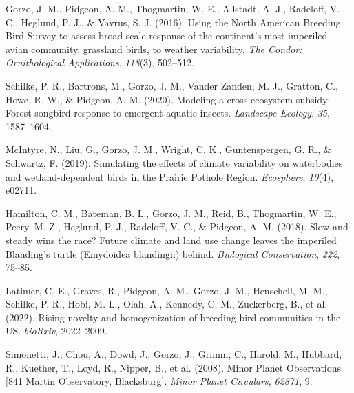 \documentclass[11pt,a4paper,]{awesome-cv}
\newlength{\cslhangindent}
\newenvironment{CSLReferences}[2] %
 {\begin{list}{}{%
  \setlength{\itemindent}{0pt}
  \setlength{\leftmargin}{0pt}
  \setlength{\parsep}{0pt}
  \ifodd #1
   \setlength{\leftmargin}{\cslhangindent}
   \setlength{\itemindent}{-1\cslhangindent}
  \fi
  \setlength{\itemsep}{#2\baselineskip}}}
 {\end{list}}
\renewcommand{\section}[1]{%
	\vspace{\acvSectionTopSkip}
	\sectionstyle{#1}
	\phantomsection
	\color{gray}\vhrulefill{0.9pt}
}
\begin{document}
\section{Peer-Reviewed Publications}\label{peer-reviewed-publications}

\label{refs-ac9b1bd4beeebee61ed7fb33c33f685f}
\begin{CSLReferences}{1}{0}
Gorzo, J. M., Pidgeon, A. M., Thogmartin, W. E., Allstadt, A. J.,
Radeloff, V. C., Heglund, P. J., \& Vavrus, S. J. (2016). Using the
North American Breeding Bird Survey to assess broad-scale response of
the continent's most imperiled avian community, grassland birds, to
weather variability. \emph{The Condor: Ornithological Applications},
\emph{118}(3), 502--512.

Schilke, P. R., Bartrons, M., Gorzo, J. M., Vander Zanden, M. J.,
Gratton, C., Howe, R. W., \& Pidgeon, A. M. (2020). Modeling a
cross-ecosystem subsidy: Forest songbird response to emergent aquatic
insects. \emph{Landscape Ecology}, \emph{35}, 1587--1604.

McIntyre, N., Liu, G., Gorzo, J. M., Wright, C. K., Guntenspergen, G.
R., \& Schwartz, F. (2019). Simulating the effects of climate
variability on waterbodies and wetland-dependent birds in the Prairie
Pothole Region. \emph{Ecosphere}, \emph{10}(4), e02711.

Hamilton, C. M., Bateman, B. L., Gorzo, J. M., Reid, B., Thogmartin, W.
E., Peery, M. Z., Heglund, P. J., Radeloff, V. C., \& Pidgeon, A. M.
(2018). Slow and steady wins the race? Future climate and land use
change leaves the imperiled Blanding's turtle (Emydoidea blandingii)
behind. \emph{Biological Conservation}, \emph{222}, 75--85.

Latimer, C. E., Graves, R., Pidgeon, A. M., Gorzo, J. M., Henschell, M.
M., Schilke, P. R., Hobi, M. L., Olah, A., Kennedy, C. M., Zuckerberg,
B., et al. (2022). Rising novelty and homogenization of breeding bird
communities in the US. \emph{bioRxiv}, 2022--2009.

Simonetti, J., Chou, A., Dowd, J., Gorzo, J., Grimm, C., Harold, M.,
Hubbard, R., Kuether, T., Loyd, R., Nipper, B., et al. (2008). Minor
Planet Observations {[}841 Martin Observatory, Blacksburg{]}.
\emph{Minor Planet Circulars}, \emph{62871}, 9.

\end{CSLReferences}
\end{document}

